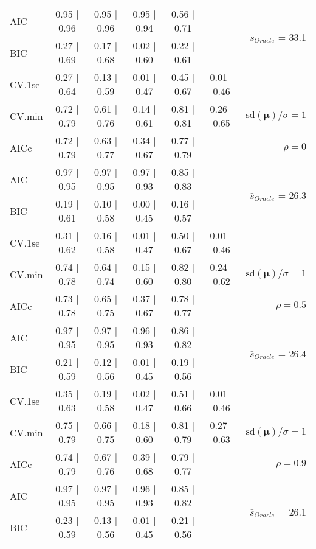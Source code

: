 \begin{table}
\begin{center}
\begin{tabular}{l*{5}{c}|r}
AIC & 0.95 $\mid$ 0.96 & 0.95 $\mid$ 0.96 & 0.95 $\mid$ 0.94 & 0.56 $\mid$ 0.71 & &  \multirow{2}{*}{$\bar{s}_{Oracle}$ = 33.1} \\
BIC & 0.27 $\mid$ 0.69 & 0.17 $\mid$ 0.68 & 0.02 $\mid$ 0.60 & 0.22 $\mid$ 0.61 & &  \\
 \hline 
CV.1se & 0.27 $\mid$ 0.64 & 0.13 $\mid$ 0.59 & 0.01 $\mid$ 0.47 & 0.45 $\mid$ 0.67 & 0.01 $\mid$ 0.46 & \\
CV.min & 0.72 $\mid$ 0.79 & 0.61 $\mid$ 0.76 & 0.14 $\mid$ 0.61 & 0.81 $\mid$ 0.81 & 0.26 $\mid$ 0.65 &  $\mathrm{sd}(\mathbf{\mu})/\sigma=1$ \\
AICc & 0.72 $\mid$ 0.79 & 0.63 $\mid$ 0.77 & 0.34 $\mid$ 0.67 & 0.77 $\mid$ 0.79 & & $\rho=0$ \\
AIC & 0.97 $\mid$ 0.95 & 0.97 $\mid$ 0.95 & 0.97 $\mid$ 0.93 & 0.85 $\mid$ 0.83 & &  \multirow{2}{*}{$\bar{s}_{Oracle}$ = 26.3} \\
BIC & 0.19 $\mid$ 0.61 & 0.10 $\mid$ 0.58 & 0.00 $\mid$ 0.45 & 0.16 $\mid$ 0.57 & &  \\
 \hline 
CV.1se & 0.31 $\mid$ 0.62 & 0.16 $\mid$ 0.58 & 0.01 $\mid$ 0.47 & 0.50 $\mid$ 0.67 & 0.01 $\mid$ 0.46 & \\
CV.min & 0.74 $\mid$ 0.78 & 0.64 $\mid$ 0.74 & 0.15 $\mid$ 0.60 & 0.82 $\mid$ 0.80 & 0.24 $\mid$ 0.62 &  $\mathrm{sd}(\mathbf{\mu})/\sigma=1$ \\
AICc & 0.73 $\mid$ 0.78 & 0.65 $\mid$ 0.75 & 0.37 $\mid$ 0.67 & 0.78 $\mid$ 0.77 & & $\rho=0.5$ \\
AIC & 0.97 $\mid$ 0.95 & 0.97 $\mid$ 0.95 & 0.96 $\mid$ 0.93 & 0.86 $\mid$ 0.82 & &  \multirow{2}{*}{$\bar{s}_{Oracle}$ = 26.4} \\
BIC & 0.21 $\mid$ 0.59 & 0.12 $\mid$ 0.56 & 0.01 $\mid$ 0.45 & 0.19 $\mid$ 0.56 & &  \\
 \hline 
CV.1se & 0.35 $\mid$ 0.63 & 0.19 $\mid$ 0.58 & 0.02 $\mid$ 0.47 & 0.51 $\mid$ 0.66 & 0.01 $\mid$ 0.46 & \\
CV.min & 0.75 $\mid$ 0.79 & 0.66 $\mid$ 0.75 & 0.18 $\mid$ 0.60 & 0.81 $\mid$ 0.79 & 0.27 $\mid$ 0.63 &  $\mathrm{sd}(\mathbf{\mu})/\sigma=1$ \\
AICc & 0.74 $\mid$ 0.79 & 0.67 $\mid$ 0.76 & 0.39 $\mid$ 0.68 & 0.79 $\mid$ 0.77 & & $\rho=0.9$ \\
AIC & 0.97 $\mid$ 0.95 & 0.97 $\mid$ 0.95 & 0.96 $\mid$ 0.93 & 0.85 $\mid$ 0.82 & &  \multirow{2}{*}{$\bar{s}_{Oracle}$ = 26.1} \\
BIC & 0.23 $\mid$ 0.59 & 0.13 $\mid$ 0.56 & 0.01 $\mid$ 0.45 & 0.21 $\mid$ 0.56 & &  \\

\end{tabular}
\end{center}
\end{table}
